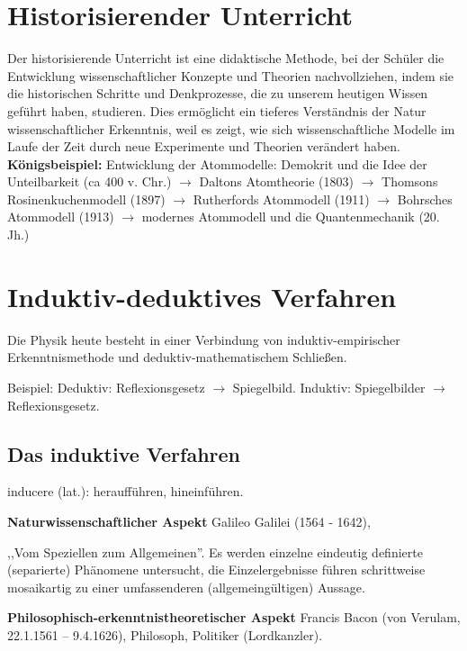 \bip\bip
\section{Historisierender Unterricht}

Der historisierende Unterricht ist eine didaktische Methode, bei der Sch\"{u}ler
die Entwicklung wissenschaftlicher Konzepte und Theorien nachvollziehen, indem sie die historischen Schritte und Denkprozesse, die zu unserem heutigen Wissen gef\"{u}hrt haben, studieren. Dies erm\"{o}glicht ein tieferes Verständnis der Natur wissenschaftlicher Erkenntnis, weil es zeigt, wie sich wissenschaftliche Modelle im Laufe der Zeit durch neue Experimente und Theorien verändert haben.
\mip
\textbf{K\"{o}nigsbeispiel:} Entwicklung der Atommodelle: Demokrit und die Idee der Unteilbarkeit (ca 400 v. Chr.) $\to$ Daltons Atomtheorie (1803) $\to$ Thomsons {\glqq}Rosinenkuchenmodell{\grqq} (1897) $\to$ Rutherfords Atommodell (1911) $\to$ Bohrsches Atommodell (1913) $\to$ modernes Atommodell und die Quantenmechanik (20. Jh.)

\bip\bip
\section{Induktiv-deduktives Verfahren}
Die Physik heute besteht in einer Verbindung von
induktiv-empirischer Erkenntnismethode und
deduktiv-mathematischem Schlie{\ss}en.

\mip
Beispiel: Deduktiv:  Reflexionsgesetz  $\to$ Spiegelbild.
Induktiv: Spiegelbilder $\to$ Reflexionsgesetz.

\subsection{Das induktive Verfahren}

inducere (lat.): herauff\"{u}hren, hineinf\"{u}hren.

\mip
{\bf Naturwissenschaftlicher Aspekt} Galileo Galilei  (1564 - 1642),

,,Vom Speziellen zum Allgemeinen''.
Es werden einzelne eindeutig definierte (separierte) Ph\"{a}nomene
untersucht, die Einzelergebnisse f\"{u}hren schrittweise
mosaikartig zu einer umfassenderen (allgemeing\"{u}ltigen) Aussage.


\bip
{\bf Philosophisch-erkenntnistheoretischer Aspekt}
Francis Bacon (von Verulam, 22.1.1561 -- 9.4.1626),
Philosoph, Politiker (Lordkanzler).


